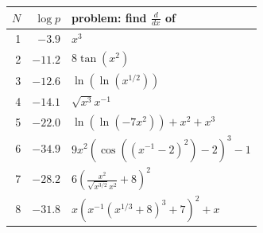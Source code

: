 {\renewcommand{\arraystretch}{1.6}\begin{tabular}{rrl}
\toprule
$N$ & $\log p$ & problem: find $\frac{d}{dx}$ of \\
\midrule
1 & $-3.9$ & $\displaystyle x^{3}$ \\
2 & $-11.2$ & $\displaystyle 8 \tan\left(x^{2}\right)$ \\
3 & $-12.6$ & $\displaystyle \ln\left(\ln\left(x^{1/2}\right)\right)$ \\
4 & $-14.1$ & $\displaystyle \sqrt{x^{3}} x^{-1}$ \\
5 & $-22.0$ & $\displaystyle \ln\left(\ln\left(-7 x^{2}\right)\right) + x^{2} + x^{3}$ \\
6 & $-34.9$ & $\displaystyle 9 x^{2} \left(\cos\left(\left(x^{-1} - 2\right)^{2}\right) - 2\right)^{3} - 1$ \\
7 & $-28.2$ & $\displaystyle 6 \left(\frac{x^{2}}{\sqrt{x^{3/2}} x^{2}} + 8\right)^{2}$ \\
8 & $-31.8$ & $\displaystyle x \left(x^{-1} \left(x^{1/3} + 8\right)^{3} + 7\right)^{2} + x$ \\
\bottomrule
\end{tabular}}
